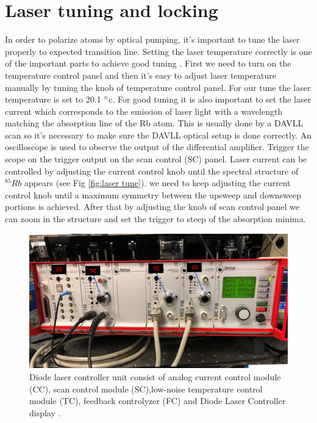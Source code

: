 \section{Laser tuning and locking}
In order to polarize atoms by optical pumping, it's important to tune the laser properly to expected transition line.
Setting the laser temperature correctly is one of the important parts to achieve good tuning . First we need to turn on the temperature control panel and then it’s easy to adjust laser temperature manually by tuning the knob of temperature control panel. For our tune the laser temperature is set to 20.1 $\degree$c. For good tuning it is also important to set the laser current which corresponds to the emission of laser light with a wavelength matching the absorption line of the Rb atom. This is usually done by a DAVLL scan so it's necessary to make sure the DAVLL optical setup is done correctly. An oscilloscope is used to observe the output of the differential amplifier. Trigger the scope on the trigger output on the scan control (SC) panel.
Laser current can be controlled by adjusting the current control knob until the spectral structure of $^{85}Rb$ appears (see Fig \ref{fig:laser tune}). we need to keep adjusting the current control knob until a maximum symmetry between the upsweep and downsweep portions is achieved. After that by adjusting the knob of scan control panel we can zoom in the structure and set the trigger to steep of the absorption minima. 
\begin{figure}[h]
\centering
\includegraphics[width=0.8\linewidth]{figures/laser_control_}
\caption{Diode laser controller unit consist of analog current control module (CC), scan control module (SC),low-noise temperature control module (TC), feedback controlyzer (FC) and Diode Laser Controller display .\label{fig:laser controller}}
\end{figure}

